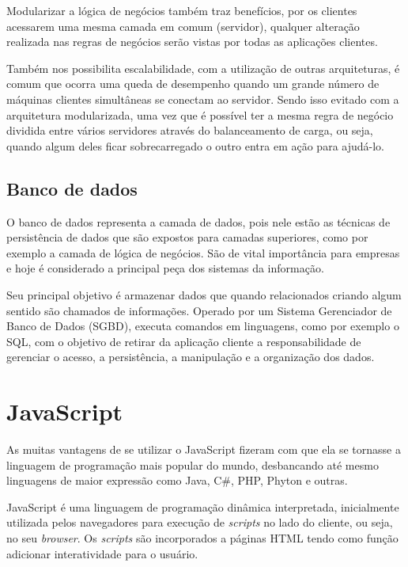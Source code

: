 \documentclass[
	12pt,				%
	openright,			%
	twoside,			%
	a4paper,			%
	english,			%
	brazil				%
	]{abntex2}
\begin{document}
Modularizar a lógica de negócios também traz benefícios, por os clientes acessarem uma mesma camada em comum (servidor), qualquer alteração realizada nas regras de negócios serão vistas por todas as aplicações clientes.

Também nos possibilita escalabilidade, com a utilização de outras arquiteturas, é comum que ocorra uma queda de desempenho quando um grande número de máquinas clientes simultâneas se conectam ao servidor. Sendo isso evitado com a arquitetura modularizada, uma vez que é possível ter a mesma regra de negócio dividida entre vários servidores através do balanceamento de carga, ou seja, quando algum deles ficar sobrecarregado o outro entra em ação para ajudá-lo. 

\subsection{Banco de dados}
\label{subsec:BancoDeDados}

O banco de dados representa a camada de dados, pois nele estão as técnicas de persistência de dados que são expostos para camadas superiores, como por exemplo a camada de lógica de negócios. São de vital importância para empresas e hoje é considerado a principal peça dos sistemas da informação.

Seu principal objetivo é armazenar dados que quando relacionados criando algum sentido são chamados de informações. Operado por um Sistema Gerenciador de Banco de Dados (SGBD), executa comandos em linguagens, como por exemplo o SQL, com o objetivo de retirar da aplicação cliente a responsabilidade de gerenciar o acesso, a persistência, a manipulação e a organização dos dados.

\section{JavaScript}

As muitas vantagens de se utilizar o JavaScript fizeram com que ela se tornasse a linguagem de programação mais popular do mundo, desbancando até mesmo linguagens de maior expressão como Java, C\#, PHP, Phyton e outras.

JavaScript é uma linguagem de programação dinâmica interpretada, inicialmente utilizada pelos navegadores para execução de \textit{scripts} no lado do cliente, ou seja, no seu \textit{browser}. Os \textit{scripts} são incorporados a páginas HTML tendo como função adicionar interatividade para o usuário.
\end{document}
